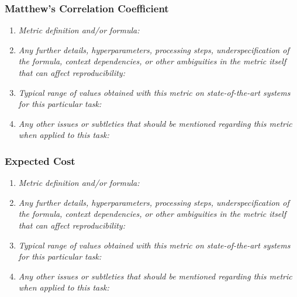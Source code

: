 \documentclass[a4paper,11pt]{article}
\begin{document}
        \subsubsection{Matthew's Correlation Coefficient}
            \begin{enumerate}[label=\alph*.]
                \item \textit{Metric definition and/or formula:}
                \bigskip
                \item \textit{Any further details, hyperparameters, processing steps, underspecification of the formula, context dependencies, or other ambiguities in the metric itself that can affect reproducibility:}
                \bigskip
                \item \textit{Typical range of values obtained with this metric on state-of-the-art systems for this particular task:}
                \bigskip
                \item \textit{Any other issues or subtleties that should be mentioned regarding this metric when applied to this task:}
                \bigskip
            \end{enumerate}
        \subsubsection{Expected Cost}
            \begin{enumerate}[label=\alph*.]
                \item \textit{Metric definition and/or formula:}
                \bigskip
                \item \textit{Any further details, hyperparameters, processing steps, underspecification of the formula, context dependencies, or other ambiguities in the metric itself that can affect reproducibility:}
                \bigskip
                \item \textit{Typical range of values obtained with this metric on state-of-the-art systems for this particular task:}
                \bigskip
                \item \textit{Any other issues or subtleties that should be mentioned regarding this metric when applied to this task:}
                \bigskip
            \end{enumerate}
\end{document}
